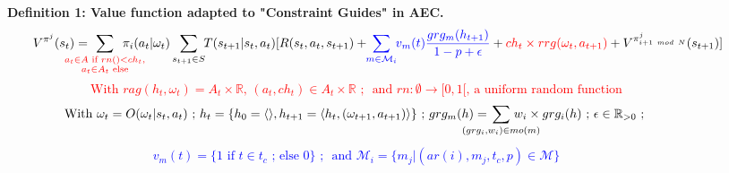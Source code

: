 \documentclass[sigconf,anonymous]{aamas}
\begin{document}

\begin{figure*}[h!]
  \label{eq:single_value_function}
  \raggedright
  \textbf{\quad Definition 1: Value function adapted to "Constraint Guides" in AEC.}
  \begin{gather*}
    \text{\quad \quad} V^{\pi^j}(s_t) = \hspace{-0.75cm} \sum_{\textcolor{red}{ \substack{a_{t} \in A \text{ if } rn() < ch_{t}, \\ 
    a_{t} \in A_{t} \text{ else}}
    }}{\hspace{-0.7cm} \pi_i(a_{t} | \omega_t)} \sum_{s_{t+1} \in S}{\hspace{-0.1cm} T(s_{t+1} | s_t, a_{t})[R(s_t,a_{t},s_{t+1}) + \hspace{-0.1cm} \textcolor{blue}{ \sum_{m \in \mathcal{M}_i}{ \hspace{-0.1cm} v_m(t) \frac{grg_m(h_{t+1})}{1 - p + \epsilon} } } + \textcolor{red}{ch_t \times rrg(\omega_t,a_{t+1})} + V^{\pi^j_{i+1 \ mod \ N}}(s_{t+1})]}
  \end{gather*}  
  \textcolor{red}{\[\text{With } rag(h_t, \omega_t) = A_{t} \times \mathbb{R} \text{, } (a_t, ch_{t}) \in A_{t} \times \mathbb{R} \text{ ; } \text{ and } rn: \emptyset \to [0,1[ \text{, a uniform random function}\]}
  \vspace{-0.5cm}
  \textcolor{blue}{
  \begin{gather*}
  \text{With } \omega_t = O(\omega_t | s_t, a_t) \text{ ; } h_t = \{h_0 = \langle \rangle, h_{t+1} = \langle h_t, (\omega_{t+1}, a_{t+1}) \rangle \} \text{ ; } grg_m(h) = \hspace{-0.8cm} \sum_{(grg_i,w_i) \in mo(m)}{\hspace{-0.8cm} w_i \times grg_i(h)} \text{ ; } \epsilon \in \mathbb{R}_{>0} \text{ ; }
  \end{gather*}
  }
  \vspace{-0.75cm}
  \textcolor{blue}{
  \begin{gather*}
  v_m(t) = \{ 1 \text{ if } t \in t_c \text{ ; else } 0 \} \text{ ; } \text{ and } \mathcal{M}_i = \{m_j | (ar(i),m_j,t_c,p) \in \mathcal{M}\}
  \end{gather*}
  }
  \vspace{-0.6cm}
  \end{figure*}
\end{document}
